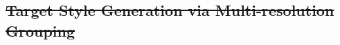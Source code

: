 \documentclass[10pt,twocolumn,letterpaper]{article}
\providecommand{\DIFdeltex}[1]{{\protect\color{red}\sout{#1}}}                      %
\providecommand{\DIFdel}[1]{\texorpdfstring{\DIFdeltex{#1}}{}} %
\begin{document}
\subsection{\DIFdel{Target Style Generation via Multi-resolution Grouping}}
\addtocounter{subsection}{-1}%
\end{document}

